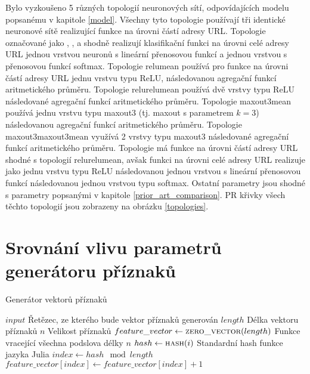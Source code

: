 Bylo vyzkoušeno 5 různých topologií neuronových sítí, odpovídajících modelu popsanému v kapitole \ref{model}. Všechny tyto topologie používají tři identické neuronové sítě realizující funkce na úrovni částí adresy URL. Topologie označované jako , ,  a  shodně realizují klasifikační funkci na úrovni celé adresy URL jednou vrstvou neuronů s lineární přenosovou funkcí a jednou vrstvou s přenosovou funkcí softmax. Topologie relumean používá pro funkce na úrovni částí adresy URL jednu vrstvu typu ReLU, následovanou agregační funkcí aritmetického průměru. Topologie relurelumean používá dvě vrstvy typu ReLU následované agregační funkcí aritmetického průměru. Topologie maxout3mean používá jednu vrstvu typu maxout3 (tj. maxout s parametrem \( k = 3 \)) následovanou agregační funkcí aritmetického průměru. Topologie maxout3maxout3mean využívá 2 vrstvy typu maxout3 následované agregační funkcí aritmetického průměru. Topologie  má funkce na úrovni částí adresy URL shodné s topologií relurelumean, avšak funkci na úrovni celé adresy URL realizuje jako jednu vrstvu typu ReLU následovanou jednou vrstvou s lineární přenosovou funkcí následovanou jednou vrstvou typu softmax. Ostatní parametry jsou shodné s parametry popsanými v kapitole \ref{prior_art_comparison}. PR křivky všech těchto topologií jsou zobrazeny na obrázku \ref{topologies}. 


\section{Srovnání vlivu parametrů generátoru příznaků}

\begin{algorithm}
	\caption{Generátor vektorů příznaků}
	\label{feature_generator}
	\begin{algorithmic}
		\Require $ input $ \Comment Řetězec, ze kterého bude vektor příznaků generován
		\Require $ length $ \Comment Délka vektoru příznaků
		\Require $ n $ \Comment Velikost příznaků
		\Statex
		\State $ feature\_vector \gets \Call{zero\_vector}{length} $
		 \Comment Funkce vracející všechna podslova délky $ n $
			\State $ hash \gets \Call{hash}{i} $ \Comment Standardní hash funkce jazyka Julia
			\State $ index \gets hash \mod length $
			\State $ feature\_vector \left[ index \right] \gets feature\_vector \left[ index \right] + 1 $
		\EndFor
	\end{algorithmic}
\end{algorithm}

